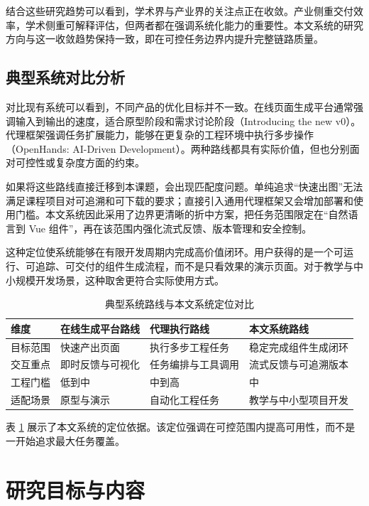 结合这些研究趋势可以看到，学术界与产业界的关注点正在收敛。产业侧重交付效率，学术侧重可解释评估，但两者都在强调系统化能力的重要性。本文系统的研究方向与这一收敛趋势保持一致，即在可控任务边界内提升完整链路质量。

\subsection{典型系统对比分析}
对比现有系统可以看到，不同产品的优化目标并不一致。在线页面生成平台通常强调输入到输出的速度，适合原型阶段和需求讨论阶段（Introducing the new v0）\cite{vercel2026newv0}。代理框架强调任务扩展能力，能够在更复杂的工程环境中执行多步操作（OpenHands: AI-Driven Development）\cite{openhands2026github}。两种路线都具有实际价值，但也分别面对可控性或复杂度方面的约束。

如果将这些路线直接迁移到本课题，会出现匹配度问题。单纯追求“快速出图”无法满足课程项目对可追溯和可下载的要求；直接引入通用代理框架又会增加部署和使用门槛。本文系统因此采用了边界更清晰的折中方案，把任务范围限定在“自然语言到 Vue 组件”，再在该范围内强化流式反馈、版本管理和安全控制。

这种定位使系统能够在有限开发周期内完成高价值闭环。用户获得的是一个可运行、可追踪、可交付的组件生成流程，而不是只看效果的演示页面。对于教学与中小规模开发场景，这种取舍更符合实际使用方式。

\begin{table}[htbp]
\centering
\caption{典型系统路线与本文系统定位对比}
\label{tab:chapter1-route}
\small
\begin{tabular}{@{}p{}p{}p{}p{}@{}}
\toprule
维度 & 在线生成平台路线 & 代理执行路线 & 本文系统路线 \\
\midrule
目标范围 & 快速产出页面 & 执行多步工程任务 & 稳定完成组件生成闭环 \\
交互重点 & 即时反馈与可视化 & 任务编排与工具调用 & 流式反馈与可追溯版本 \\
工程门槛 & 低到中 & 中到高 & 中 \\
适配场景 & 原型与演示 & 自动化工程任务 & 教学与中小型项目开发 \\
\bottomrule
\end{tabular}
\end{table}

表 \ref{tab:chapter1-route} 展示了本文系统的定位依据。该定位强调在可控范围内提高可用性，而不是一开始追求最大任务覆盖。

\section{研究目标与内容}
